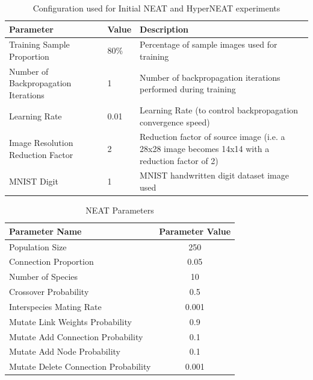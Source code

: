 \documentclass{acm_proc_article-sp}
\begin{document}
\begin{table}[t]
	\caption{Configuration used for Initial NEAT and HyperNEAT experiments}
	\small
	\centering
	\begin{tabular}{|p{5cm}|p{0.8cm}|p{9cm}|}
		\hline\hline
		\textbf{Parameter} & \textbf{Value} & \textbf{Description} \\
		
		\hline
		
		Training Sample Proportion & 80\% & Percentage of sample images used for training \\
		\hline
		Number of Backpropagation Iterations & 1 & Number of backpropagation iterations performed during training \\
		\hline
		Learning Rate & 0.01 & Learning Rate (to control backpropagation convergence speed) \\
		\hline
		Image Resolution Reduction Factor & 2 & Reduction factor of source image (i.e. a 28x28 image becomes 14x14 with a reduction factor of 2) \\
		\hline
		MNIST Digit & 1 & MNIST handwritten digit dataset image used \\
		
		\hline
	\end{tabular}
	\label{table:initialconfiguration}
\end{table}

\begin{table}[h]
	\caption{NEAT Parameters}
	\small
	\centering
	\begin{tabular}{l c}
		\hline\hline
		\textbf{Parameter Name} & \textbf{Parameter Value} \\
		\hline
		Population Size & 250 \\
		Connection Proportion & 0.05 \\
		Number of Species & 10 \\
		Crossover Probability & 0.5 \\
		Interspecies Mating Rate & 0.001 \\
		Mutate Link Weights Probability & 0.9 \\
		Mutate Add Connection Probability & 0.1 \\
		Mutate Add Node Probability & 0.1 \\
		Mutate Delete Connection Probability & 0.001 \\
		\hline
	\end{tabular}
	\label{table:neatparameters}
\end{table}
\end{document}
